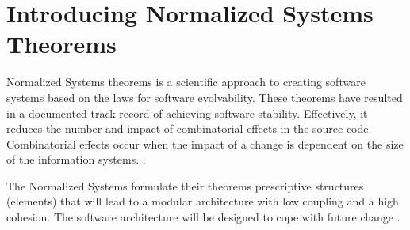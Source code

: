 \section{Introducing Normalized Systems Theorems}

Normalized Systems theorems is a scientific approach to creating software systems based on
the laws for software evolvability. These theorems have resulted in a documented track
record of achieving software stability. Effectively, it reduces the number and impact of
combinatorial effects in the source code. Combinatorial effects occur when the impact of a
change is dependent on the size of the information systems.
\parencite[]{mannaert_normalized_2009}. 

The Normalized Systems formulate their theorems prescriptive structures (elements)
that will lead to a modular architecture with low coupling and a high cohesion. The
software architecture will be designed to cope with future change
\parencites[]{mannaert_normalized_2009}.         